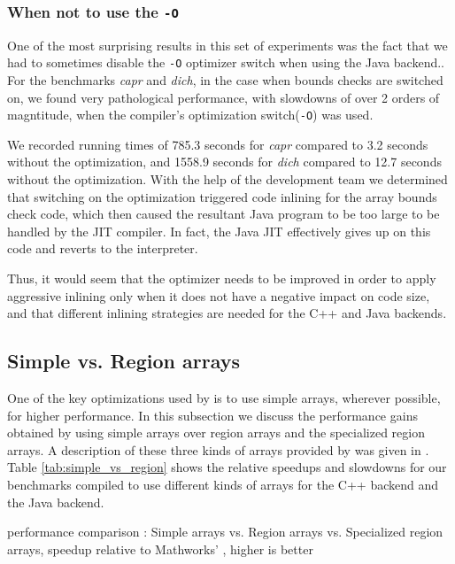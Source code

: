 \subsubsection{When not to use the \xten \texttt{-O}}
\label{subsec:BOOM}

One of the most surprising results in this set of experiments was the fact that
we had to sometimes disable the \xten \texttt{-O} optimizer switch when
using the \xten Java backend..
For the benchmarks \emph{capr} and
\emph{dich}, in the case when \xten bounds checks are switched on, we found
very pathological performance, with slowdowns of over 2 orders of magntitude,
when the \xten compiler's optimization switch(\texttt{-O}) was used.

We recorded running times of 785.3 seconds for \emph{capr} compared to 3.2
seconds without the optimization, and 1558.9 seconds for \emph{dich} compared to
12.7 seconds without the optimization.  With the help of the \xten development
team we determined that switching on the optimization triggered code inlining
for the array bounds check code, which then
caused the resultant Java program to be too large to be handled by the JIT
compiler.  In fact, the Java JIT effectively gives up on this code and reverts 
to the interpreter. 

Thus, it would seem that the \xten optimizer needs to be improved in order to
apply aggressive inlining only when it does not have a negative impact on code
size,  and that different inlining strategies are needed for the C++ and Java
backends.

\subsection{Simple vs. Region arrays} \label{subsec:EvalArrays}

One of the key optimizations used by \mixten is to use simple arrays,
wherever possible, for higher performance.  In this subsection we discuss the
performance gains obtained by using simple arrays over region arrays and
the specialized region arrays.  A description of these three kinds of arrays
provided by \xten was given in .  Table
\ref{tab:simple_vs_region} shows the relative speedups and slowdowns for our
benchmarks compiled to use different kinds of \xten arrays for the C++ backend
and the Java backend.

\begin{table}[htbp]
\begin{center} 
\begin{footnotesize}

\end{footnotesize}
\caption{\mixten performance comparison : Simple
arrays vs. Region arrays vs.  Specialized region arrays, speedup relative to 
Mathworks' \matlab, higher is better} 
\label{tab:simple_vs_region} 
\end{center}
\end{table}

